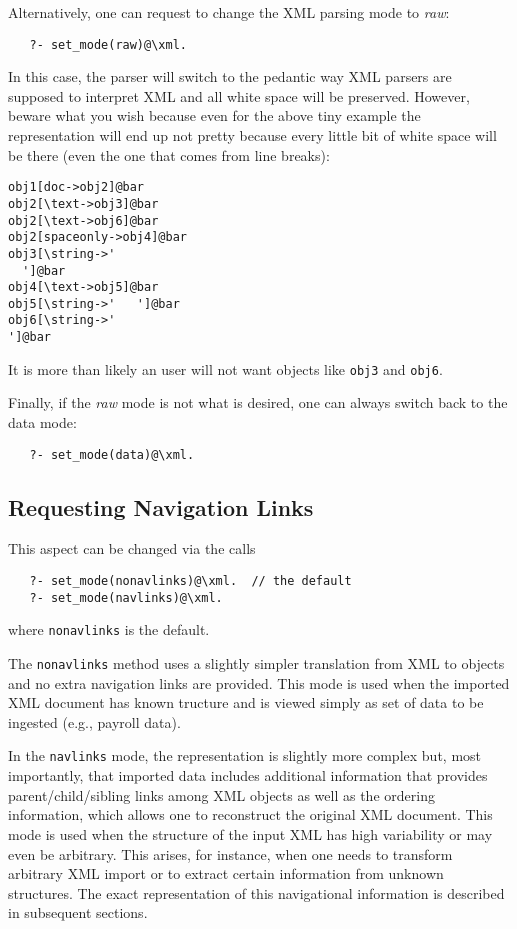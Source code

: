 Alternatively, one can request to change the XML parsing mode
to \emph{raw}:
\begin{verbatim}
   ?- set_mode(raw)@\xml.
\end{verbatim}
In this case, the parser will switch to the pedantic way XML parsers are
supposed to interpret XML and all white space will be
preserved. However, beware what you wish because even for the above tiny
example the representation will end up not pretty because every little bit
of white space will be there (even the one that comes from line breaks):
\begin{verbatim}
obj1[doc->obj2]@bar
obj2[\text->obj3]@bar
obj2[\text->obj6]@bar
obj2[spaceonly->obj4]@bar
obj3[\string->'
  ']@bar
obj4[\text->obj5]@bar
obj5[\string->'   ']@bar
obj6[\string->'
']@bar
\end{verbatim}
It is more than likely an \FLSYSTEM user will not want objects like
\texttt{obj3} and \texttt{obj6}.  

Finally, if the \emph{raw} mode is not what is desired, one can always
switch back to the data mode: 
\begin{verbatim}
   ?- set_mode(data)@\xml.
\end{verbatim}

\subsection{Requesting Navigation Links}

This aspect can be changed via the calls
\begin{verbatim}
   ?- set_mode(nonavlinks)@\xml.  // the default
   ?- set_mode(navlinks)@\xml.
\end{verbatim}
where \texttt{nonavlinks} is the default.

The \texttt{nonavlinks} method uses a slightly simpler translation from XML
to \FLSYSTEM objects and no extra navigation links are provided.
This mode is used when the imported XML document has known tructure
and is viewed simply as
set of data to be ingested (e.g., payroll data).

In the \texttt{navlinks} mode, the representation is slightly more complex
but, most importantly, that imported data includes additional information 
that provides parent/child/sibling links among XML objects as well as the
ordering information, which allows one to reconstruct the original XML
document.  This mode is used when the structure
of the input XML has high variability or may even be arbitrary. This
arises, for instance, when one needs to transform arbitrary XML import or
to extract certain information from unknown structures.
The exact representation of this navigational information is described in 
subsequent sections.


